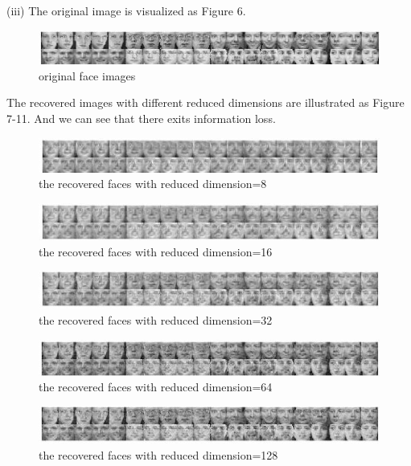 \documentclass[11pt]{article} %
\begin{document}
(iii) The original image is visualized as Figure 6.\\
\begin{figure}[h]
\centering
\includegraphics[width=5in]{originface.jpg}  %
\caption{original face images}
\label{fig1}
\end{figure}

The recovered images with different reduced dimensions are illustrated as Figure 7-11. And we can see that there exits information loss.

\begin{figure}[h]
\centering
\includegraphics[width=5in]{recover8.jpg}  %
\caption{the recovered faces with reduced dimension=8}
\label{fig1}
\end{figure}

\begin{figure}[h]
\centering
\includegraphics[width=5in]{recover16.jpg}  %
\caption{the recovered faces with reduced dimension=16}
\label{fig1}
\end{figure}

\begin{figure}[h]
\centering
\includegraphics[width=5in]{recover32.jpg}  %
\caption{the recovered faces with reduced dimension=32}
\label{fig1}
\end{figure}

\begin{figure}[h]
\centering
\includegraphics[width=5in]{recover64.jpg}  %
\caption{the recovered faces with reduced dimension=64}
\label{fig1}
\end{figure}

\begin{figure}[h]
\centering
\includegraphics[width=5in]{recoverface.jpg}  %
\caption{the recovered faces with reduced dimension=128}
\label{fig1}
\end{figure}
\end{document}
